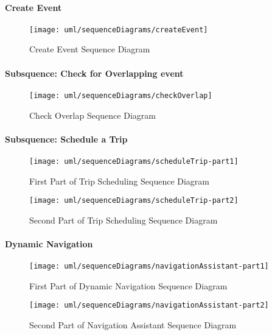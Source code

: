 \paragraph{Create Event}
	\begin{figure}[H]
		\centering
		\texttt{[image: uml/sequenceDiagrams/createEvent]}
		\caption{Create Event Sequence Diagram}
	\end{figure}
	\vfill
	
\paragraph{Subsquence: Check for Overlapping event}
	\begin{figure}[H]
		\centering
		\texttt{[image: uml/sequenceDiagrams/checkOverlap]}
		\caption{Check Overlap Sequence Diagram}
	\end{figure}
	\vfill
		
\paragraph{Subsquence: Schedule a Trip}	
	\begin{figure}[H]
		\centering
		\texttt{[image: uml/sequenceDiagrams/scheduleTrip-part1]}
		\caption{First Part of Trip Scheduling Sequence Diagram}
	\end{figure}
	
	\vfill
	
	\begin{figure}[ht!]\ContinuedFloat
		\centering
		\texttt{[image: uml/sequenceDiagrams/scheduleTrip-part2]}
		\caption{Second Part of Trip Scheduling Sequence Diagram}
		\label{loginRunTimeView}
	\end{figure}

	\vfill
	
\paragraph{Dynamic Navigation}	
	\begin{figure}[H]
		\centering
		\texttt{[image: uml/sequenceDiagrams/navigationAssistant-part1]}
		\caption{First Part of Dynamic Navigation Sequence Diagram}
	\end{figure}
	
	\vfill
	
	\begin{figure}[ht!]\ContinuedFloat
		\centering
		\texttt{[image: uml/sequenceDiagrams/navigationAssistant-part2]}
		\caption{Second Part of Navigation Assistant Sequence Diagram}
		\label{loginRunTimeView}
	\end{figure}

